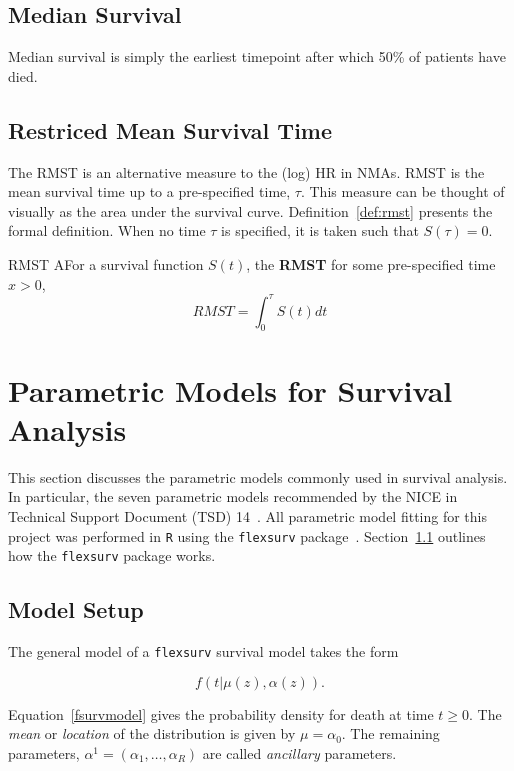 \subsection{Median Survival}
Median survival is simply the earliest timepoint after which 50\% of patients have died. 

\subsection{Restriced Mean Survival Time}
The RMST is an alternative measure to the (log) HR in NMAs. RMST is the mean survival time up to a pre-specified time, $\tau$. This measure can be thought of visually as the area under the survival curve. Definition~\ref{def:rmst} presents the formal definition. When no time $\tau$ is specified, it is taken such that $S(\tau) = 0$.

\begin{definition}[label=def:rmst]{RMST}
    AFor a survival function $S(t)$, the \textbf{RMST} for some pre-specified time $x > 0$,
    \begin{equation}
        RMST = \int_{0}^{\tau} S(t)dt
    \end{equation}
\end{definition}

\section{Parametric Models for Survival Analysis}
This section discusses the parametric models commonly used in survival analysis. In particular, the seven parametric models recommended by the NICE in Technical Support Document (TSD) 14~\cite{tsd14}. All parametric model fitting for this project was performed in \verb|R| using the \verb|flexsurv| package~\cite{flexsurv}. Section~\ref{flexSetup} outlines how the \verb|flexsurv| package works.

\subsection{Model Setup}\label{flexSetup}
The general model of a \verb|flexsurv| survival model takes the form 

\begin{equation}
    \label{fsurvmodel}
    f(t|\mu(z), \alpha(z)).
\end{equation}

Equation~\ref{fsurvmodel} gives the probability density for death at time $t \geq 0$. The \textit{mean} or \textit{location} of the distribution is given by $\mu = \alpha_0$. The remaining parameters, $\alpha^1 = (\alpha_1, \ldots, \alpha_R)$ are called \textit{ancillary} parameters. \\

